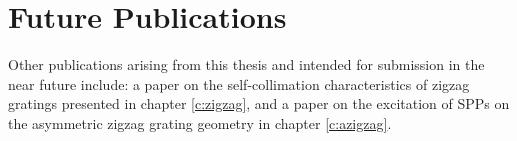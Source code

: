 \section*{Future Publications}

Other publications arising from this thesis and intended for submission in the near future include: a paper on the self-collimation characteristics of zigzag gratings presented in chapter \ref{c:zigzag}, and a paper on the excitation of SPPs on the asymmetric zigzag grating geometry in chapter \ref{c:azigzag}.
